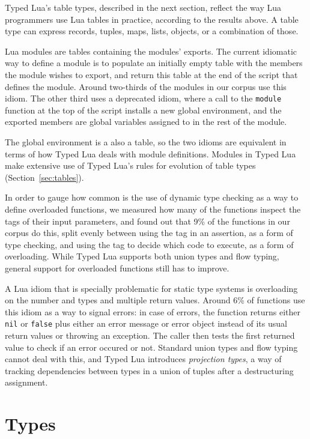 \documentclass{sigplanconf}
\begin{document}
Typed Lua's table types, described in the next section,
reflect the way Lua programmers use Lua tables in practice,
according to the results above. A table type can express
records, tuples, maps, lists, objects, or a combination of
those.

Lua modules are tables containing the modules' exports.
The current idiomatic way to define a module is to populate
an initially empty table with the members the module wishes
to export, and return this table at the end of the script
that defines the module. Around two-thirds of the modules
in our corpus use this idiom. The other third uses a
deprecated idiom, where a call to the {\tt module} function
at the top of the script installs a new global environment,
and the exported members are global variables assigned to
in the rest of the module.

The global environment is a also a table, so the two idioms
are equivalent in terms of how Typed Lua deals with module
definitions. Modules in Typed Lua make extensive use of Typed
Lua's rules for evolution of table types
(Section~\ref{sec:tables}).

In order to gauge how common is the use of dynamic type
checking as a way to define overloaded functions, we
measured how many of the functions inspect the
tags of their input parameters, and found out that 9\%
of the functions in our corpus do this, split evenly
between using the tag in an assertion, as a form of
type checking, and using the tag to decide which code
to execute, as a form of overloading. While Typed Lua
supports both union types and flow typing, general
support for overloaded functions still has to improve.

A Lua idiom that is specially problematic for static type
systems is overloading on the number and types and
multiple return values. Around 6\% of functions use
this idiom as a way to signal errors: in case of errors,
the function returns either {\tt nil} or {\tt false} plus
either an error message or error object instead of its usual
return values or throwing an exception. The caller then
tests the first returned value to check if an error occured
or not. Standard union types and flow typing cannot deal
with this, and Typed Lua introduces {\em projection types},
a way of tracking dependencies between types in a union of
tuples after a destructuring assignment.

\section{Types}
\label{sec:types}
\end{document}
